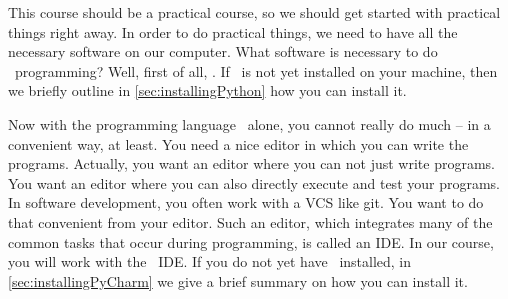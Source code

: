 %
%
This course should be a practical course, so we should get started with practical things right away.
In order to do practical things, we need to have all the necessary software on our computer.
What software is necessary to do \python\ programming?
Well, first of all, \python.
If \python\ is not yet installed on your machine, then we briefly outline in \cref{sec:installingPython} how you can install it.

Now with the programming language \python\ alone, you cannot really do much -- in a convenient way, at least.
You need a nice editor in which you can write the programs.
Actually, you want an editor where you can not just write programs.
You want an editor  where you can also directly execute and test your programs.
In software development, you often work with a \gls{VCS} like \gls{git}.
You want to do that convenient from your editor.
Such an editor, which integrates many of the common tasks that occur during programming, is called an \gls{IDE}.
In our course, you will work with the \pycharm\ \gls{IDE}.
If you do not yet have \pycharm\ installed, in \cref{sec:installingPyCharm} we give a brief summary on how you can install it.%
%
%
%
%
\endhsection%
%
